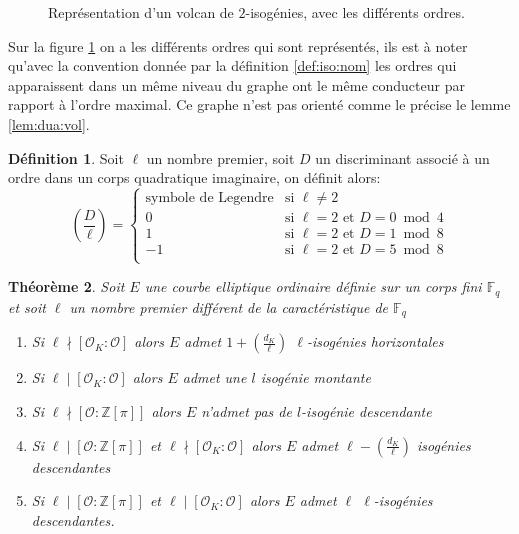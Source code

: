 \documentclass[10pt,a4paper]{book}
\theoremstyle{plain}
\newtheorem{thm}{Théorème}[chapter]
\theoremstyle{definition}
\theoremstyle{definition}
\theoremstyle{definition}
\theoremstyle{definition}
\newtheorem{defi}[thm]{Définition}
\theoremstyle{remark}
\theoremstyle{remark}
\theoremstyle{definition}
\begin{document}
\begin{figure}
\begin{center}
\begin{tikzpicture}[scale=0.60]


\end{tikzpicture}
\end{center}
\caption{Représentation d'un volcan de $2$-isogénies, avec les différents ordres.}		
\label{fig:ord:vol}
\end{figure}
Sur la figure \ref{fig:ord:vol} on a les différents ordres qui sont représentés, ils est à noter qu'avec la convention donnée par la définition \ref{def:iso:nom} les ordres qui apparaissent dans un même niveau du graphe ont le même conducteur par rapport à l'ordre maximal. Ce graphe n'est pas orienté comme le précise le lemme \ref{lem:dua:vol}.

\begin{defi}
Soit $\ell$ un nombre premier, soit $D$ un discriminant associé à un ordre dans un corps quadratique imaginaire, on définit alors:
\begin{equation*}
\left( \frac{D}{\ell} \right)= \begin{cases}
  \text{symbole de Legendre} & \text{si } \ell\neq 2 \\
0 & \text{si } \ell=2 \text{ et } D=0 \bmod 4 \\
1 & \text{si } \ell=2 \text{ et } D=1 \bmod 8 \\
-1 & \text{si } \ell=2 \text{ et } D=5 \bmod 8 \\
\end{cases}
\end{equation*}
\end{defi}

\begin{thm}
\label{thm:Koh:cas}
Soit $E$ une courbe elliptique ordinaire définie sur un corps fini $\mathbb{F}_q$ et soit $\ell$ un nombre premier différent de la caractéristique de $\mathbb{F}_q$
\begin{enumerate}
\item Si $\ell \nmid [\mathcal{O}_K : \mathcal{O}]$ alors $E$ admet $ 1 + \left( \frac{d_K}{\ell} \right)$ $\ell$-isogénies horizontales
\item Si $\ell \mid [\mathcal{O}_K : \mathcal{O}]$ alors $E$ admet une $l$ isogénie montante
\item Si $\ell \nmid [\mathcal{O} : \mathbb{Z}[\pi]]$ alors $E$ n'admet pas de $l$-isogénie descendante
\item Si $\ell \mid [\mathcal{O} : \mathbb{Z}[\pi]]$ et $\ell \nmid [\mathcal{O}_K : \mathcal{O}]$ alors $E$ admet $\ell-\left( \frac{d_K}{\ell} \right)$ isogénies descendantes
\item  Si $\ell \mid [\mathcal{O} : \mathbb{Z}[\pi]]$ et $\ell \mid [\mathcal{O}_K : \mathcal{O}]$ alors $E$ admet $\ell$ $\ell$-isogénies descendantes.
\end{enumerate}
\end{thm}
\end{document}
